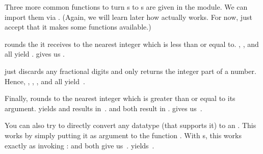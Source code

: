 Three more common functions to turn s to s are given in the  module.
We can import them via .
(Again, we will learn later how  actually works.
For now, just accept that it makes some functions available.)

 rounds the  it receives to the nearest integer which is less than or equal to.
, , and  all yield .
 gives us .

 just discards any fractional digits and only returns the integer part of a number.
Hence, , , , and  all yield~.

Finally,  rounds to the nearest integer which is greater than or equal to its argument.
 yields  and  results in~.
 and  both result in .
 gives us~.

You can also try to directly convert any datatype (that supports it) to an .
This works by simply putting it as argument to the function .
With s, this works exactly as invoking :
 and  both give us~.
 yields~.

